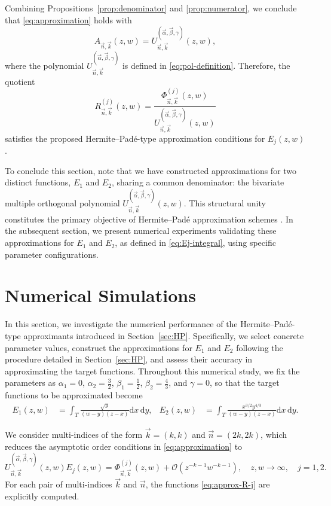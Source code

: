 \documentclass[11pt,reqno]{amsart}
\theoremstyle{definition}
\begin{document}
Combining Propositions~\ref{prop:denominator} and \ref{prop:numerator}, we conclude that \eqref{eq:approximation} holds with
\[
A_{\vec n,\vec k}(z,w)=
U_{\vec n,\vec k}^{(\vec\alpha,\vec\beta,\gamma)}(z,w),
\]
where the polynomial
$U_{\vec n,\vec k}^{(\vec\alpha,\vec\beta,\gamma)}$
is defined in \eqref{eq:pol-definition}. Therefore, the quotient
\begin{equation}
    \label{eq:approx-R-j}
    R_{\vec n,\vec k}^{(j)}(z,w)=\frac{\Phi_{\vec n,\vec k}^{(j)}(z,w)}
{U_{\vec n,\vec k}^{(\vec\alpha,\vec\beta,\gamma)}(z,w)}
\end{equation}
satisfies the proposed Hermite--Padé-type approximation conditions for
$E_j(z,w)$.

To conclude this section, note that we have constructed approximations for two distinct functions, $E_1$ and $E_2$, sharing a common denominator: the bivariate multiple orthogonal polynomial $U_{\vec n, \vec k}^{(\vec \alpha, \vec \beta, \gamma)}(z,w)$. This structural unity constitutes the primary objective of Hermite--Pad\'e approximation schemes \citep{VA06}. In the subsequent section, we present numerical experiments validating these approximations for $E_1$ and $E_2$, as defined in \eqref{eq:Ej-integral}, using specific parameter configurations.

\section{Numerical Simulations}\label{sec:simulations}

In this section, we investigate the numerical performance of the Hermite--Padé-type approximants introduced in Section~\ref{sec:HP}. Specifically, we select concrete parameter values, construct the approximations for $E_1$ and $E_2$ following the procedure detailed in Section~\ref{sec:HP}, and assess their accuracy in approximating the target functions. Throughout this numerical study, we fix the parameters as $\alpha_1=0$, $\alpha_2=\frac{3}{2}$, $\beta_1=\frac{1}{2}$, $\beta_2=\frac{4}{3}$, and $\gamma=0$, so that the target functions to be approximated become
\begin{align*}
    E_1(z,w)&=\int_T\frac{\sqrt{y}}{(w-y) (z-x)}\mathrm{d} x\, \mathrm{d} y, & E_2(z,w)&=\int_T \frac{x^{3/2} y^{4/3}}{(w-y) (z-x)}\mathrm{d} x\, \mathrm{d} y.
\end{align*}

We consider multi-indices of the form $\vec k = (k,k)$ and $\vec n =(2k,2k)$, which reduces the asymptotic order conditions in \eqref{eq:approximation} to
$$
U_{\vec n,\vec k}^{(\vec\alpha,\vec\beta,\gamma)}(z,w) E_j(z,w) = \Phi_{\vec n,\vec k}^{(j)}(z,w) + \mathcal O (z^{-k-1} w^{-k-1}),\quad z,w\longrightarrow\infty, \quad j=1,2.
$$
For each pair of multi-indices $\vec k$ and $\vec n$, the functions \eqref{eq:approx-R-j} are explicitly computed.
\end{document}
